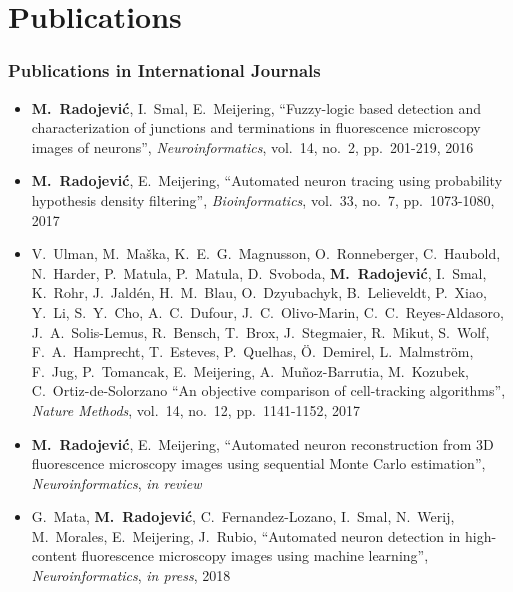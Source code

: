 %
%

\noquote
\orgchpos
\chapter*{Publications}
\label{publications}

\small
\normalsize

\subsection*{Publications in International Journals}
\vspace{1ex}
\begin{itemize}
	\item \textbf{M.~Radojevi\'{c}}, I.~Smal, E.~Meijering, ``Fuzzy-logic based detection and characterization of junctions and terminations in fluorescence microscopy images of neurons'', \emph{Neuroinformatics}, vol.~14, no.~2, pp.~201-219, 2016
	
	\item \textbf{M.~Radojevi\'{c}}, E.~Meijering, ``Automated neuron tracing using probability hypothesis density filtering'', \emph{Bioinformatics}, vol.~33, no.~7, pp.~1073-1080, 2017
	
	\item V.~Ulman, M.~Ma\v{s}ka, K.~E.~G.~Magnusson, O.~Ronneberger, C.~Haubold, N.~Harder, P.~Matula, P.~Matula, D.~Svoboda, \textbf{M.~Radojevi\'{c}}, I.~Smal, K.~Rohr, J.~Jald\'{e}n, H.~M.~Blau, O.~Dzyubachyk, B.~Lelieveldt, P.~Xiao, Y.~Li, S.~Y.~Cho, A.~C.~Dufour,	J.~C.~Olivo-Marin, C.~C.~Reyes-Aldasoro, J.~A.~Solis-Lemus, R.~Bensch, T.~Brox, J.~Stegmaier, R.~Mikut, S.~Wolf,	F.~A.~Hamprecht, T.~Esteves, P.~Quelhas, \"{O}.~Demirel, L.~Malmstr\"{o}m, F.~Jug, P.~Tomancak, E.~Meijering, A.~Mu\~{n}oz-Barrutia, M.~Kozubek, C.~Ortiz-de-Solorzano ``An objective comparison of cell-tracking algorithms'', \emph{Nature Methods}, vol.~14, no.~12, pp.~1141-1152, 2017
	
	\item \textbf{M.~Radojevi\'{c}}, E.~Meijering, ``Automated neuron reconstruction from 3D fluorescence microscopy images using sequential Monte Carlo estimation'', \emph{Neuroinformatics}, \emph{in review}%
	
	\item G.~Mata, \textbf{M.~Radojevi\'{c}}, C.~Fernandez-Lozano, I.~Smal, N.~Werij, M.~Morales, E.~Meijering, J.~Rubio, ``Automated neuron detection in high-content fluorescence microscopy images using machine learning'', \emph{Neuroinformatics}, \emph{in press}, 2018%
\end{itemize}

